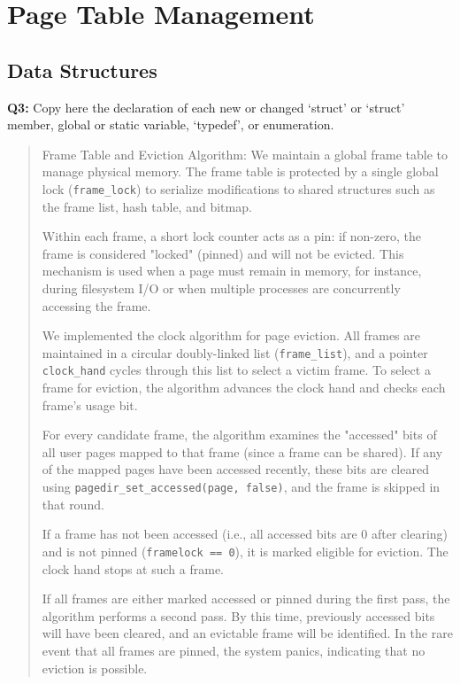 \documentclass[a4paper,11pt]{paper}
\begin{document}
\section{Page Table Management}

\subsection{Data Structures}
\textbf{Q3:} Copy here the declaration of each new or changed `struct' or `struct' member, global or static variable, `typedef', or enumeration.

\begin{quote}
Frame Table and Eviction Algorithm: We maintain a global frame table to manage physical memory. The frame table is protected by a single global lock (\texttt{frame\_lock}) to serialize modifications to shared structures such as the frame list, hash table, and bitmap. 

Within each frame, a short lock counter acts as a pin: if non-zero, the frame is considered "locked" (pinned) and will not be evicted. This mechanism is used when a page must remain in memory, for instance, during filesystem I/O or when multiple processes are concurrently accessing the frame.

We implemented the clock algorithm for page eviction. All frames are maintained in a circular doubly-linked list (\texttt{frame\_list}), and a pointer \texttt{clock\_hand} cycles through this list to select a victim frame. To select a frame for eviction, the algorithm advances the clock hand and checks each frame’s usage bit.

For every candidate frame, the algorithm examines the "accessed" bits of all user pages mapped to that frame (since a frame can be shared). If any of the mapped pages have been accessed recently, these bits are cleared using \texttt{pagedir\_set\_accessed(page, false)}, and the frame is skipped in that round.

If a frame has not been accessed (i.e., all accessed bits are 0 after clearing) and is not pinned (\texttt{frame{\textrightarrow}lock == 0}), it is marked eligible for eviction. The clock hand stops at such a frame. 

If all frames are either marked accessed or pinned during the first pass, the algorithm performs a second pass. By this time, previously accessed bits will have been cleared, and an evictable frame will be identified. In the rare event that all frames are pinned, the system panics, indicating that no eviction is possible.


\end{quote}
\end{document}
